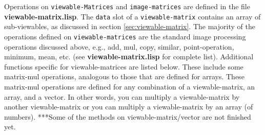 Operations on {\tt viewable-Matrices} and {\tt image-matrices} are
defined in the file {\bf viewable-matrix.lisp}.  The {\tt data} slot
of a {\tt viewable-matrix} contains an array of sub-viewables, as
discussed in section \ref{sec:viewable-matrix}.  The majority of the
operations defined on {\tt viewable-matrices} are the standard image
processing operations discussed above, e.g., add, mul, copy, similar,
point-operation, minimum, mean, etc. (see {\bf viewable-matrix.lisp}
for complete list).  Additional functions specific for
viewable-matrices are listed below.  These include some matrix-mul
operations, analogous to those that are defined for arrays.  These
matrix-mul operations are defined for any combination of a
viewable-matrix, an array, and a vector.  In other words, you can
multiply a viewable-matrix by another viewable-matrix or you can
multiply a viewable-matrix by an array (of numbers).  ***Some of the
methods on viewable-matrix/vector are not finished yet.
